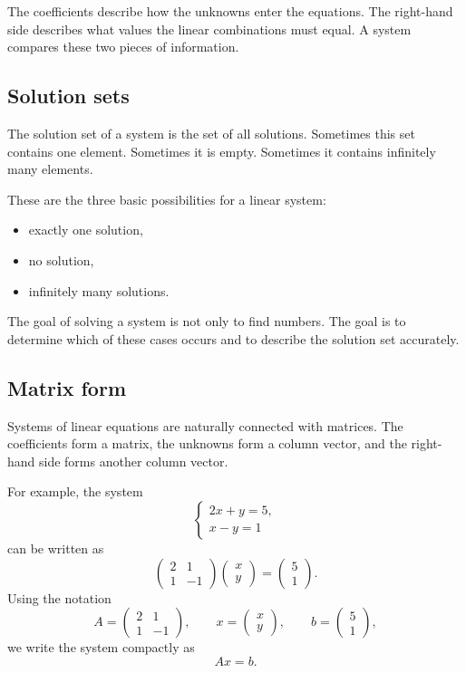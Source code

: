 \begin{remarkbox}
The coefficients describe how the unknowns enter the equations. The right-hand side describes what values the linear combinations must equal. A system compares these two pieces of information.
\end{remarkbox}

\subsection*{Solution sets}

The solution set of a system is the set of all solutions. Sometimes this set contains one element. Sometimes it is empty. Sometimes it contains infinitely many elements.

These are the three basic possibilities for a linear system:
\begin{itemize}
\item exactly one solution,
\item no solution,
\item infinitely many solutions.
\end{itemize}

The goal of solving a system is not only to find numbers. The goal is to determine which of these cases occurs and to describe the solution set accurately.

\subsection*{Matrix form}

Systems of linear equations are naturally connected with matrices. The coefficients form a matrix, the unknowns form a column vector, and the right-hand side forms another column vector.

For example, the system
\[
\begin{cases}
2x+y=5,\\
x-y=1
\end{cases}
\]
can be written as
\[
\begin{pmatrix}
2&1\\
1&-1
\end{pmatrix}
\begin{pmatrix}
x\\y
\end{pmatrix}
=
\begin{pmatrix}
5\\1
\end{pmatrix}.
\]
Using the notation
\[
A=\begin{pmatrix}2&1\\1&-1\end{pmatrix},
\qquad
x=\begin{pmatrix}x\\y\end{pmatrix},
\qquad
b=\begin{pmatrix}5\\1\end{pmatrix},
\]
we write the system compactly as
\[
Ax=b.
\]


